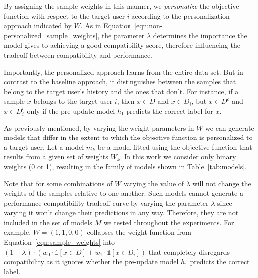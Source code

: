 \documentclass[letterpaper]{article} %
\theoremstyle{definition}
\newcommand{\kibitz}[2]{\ifnum\Comments=1{\color{#1}{#2}}\fi}
\newcommand{\ym}[1]{\kibitz{blue}{[YM:#1]}}
\newcommand{\li}[1]{\kibitz{brown}{[LL:#1]}}
\begin{document}
By assigning the sample weights in this manner, we \emph{personalize} the objective function with respect to the target user $i$ according to the personalization approach indicated by $W$.
As in Equation~\ref{eqn:non-personalized_sample_weights}, the parameter $\lambda$ determines the importance the model gives to achieving a good compatibility score, therefore influencing the tradeoff between compatibility and performance.

Importantly, the personalized approach learns from the entire data set. But in contrast to the baseline approach, it distinguishes between the samples that belong to the target user's history and the ones that don't.
For instance, if a sample $x$ belongs to the target user $i$, then  $x\in D$ and $x\in D_i$, but $x \in D^c$ and $x\in D^c_i$ only if the pre-update model $h_1$ predicts the correct label for $x$.
%

As previously mentioned, by varying the weight parameters in $W$ we can generate models that differ in the extent to which the objective function is personalized to a target user. Let a model $m_k$ be a model fitted using the objective function that results from a given set of weights $W_k$. In this work we consider only binary weights (0 or 1), resulting in the family of models shown in Table~\ref{tab:models}.

\li{I don't understand what comes next. Once we polish this explanation we should probably move it to the end of the previous paragraph. The reader will be asking the question of where are the other models in the table 1 as soon as we mention it.}\ym{moved it, but I'm not sure how to improve it} Note that for some combinations of $W$ varying the value of  $\lambda$ will not change the weights of the samples relative to one another. Such models cannot generate a performance-compatibility tradeoff curve by varying the parameter $\lambda$ since varying it won't change their predictions in any way. Therefore, they are not included in the set of models $M$ we tested throughout the experiments. For example, $W=(1,1,0,0)$ collapses the weight function from Equation~\ref{eqn:sample_weights} into $(1-\lambda)\cdot (w_0\cdot \mathbb{1}[x\in D]+w_1\cdot \mathbb{1}[x\in D_i])$ that completely disregards compatibility as it ignores whether the pre-update model $h_1$ predicts the correct label.
\end{document}

